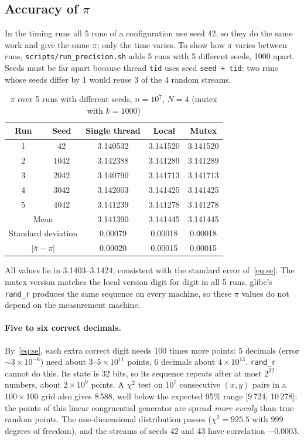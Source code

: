 \documentclass[11pt,a4paper]{article}
\newcommand{\code}[1]{\texttt{#1}}
\begin{document}
\subsection{Accuracy of $\pi$}
\label{sec:pi}
In the timing runs all 5 runs of a configuration use seed 42, so they do the same work and give the same $\pi$; only the time varies. To show how $\pi$ varies between runs, \code{scripts/run\_precision.sh} adds 5 runs with 5 different seeds, 1000 apart. Seeds must be far apart because thread \code{tid} uses seed \code{seed + tid}: two runs whose seeds differ by 1 would reuse 3 of the 4 random streams.

\begin{table}[H]
\centering
\caption{$\pi$ over 5 runs with different seeds, $n=10^7$, $N=4$ (mutex with $k=1000$)}
\label{tab:pi_runs}
\begin{tabular}{cc|ccc}
\toprule
Run & Seed & Single thread & Local & Mutex \\
\midrule
1 & 42   & 3.140532 & 3.141520 & 3.141520 \\
2 & 1042 & 3.142388 & 3.141289 & 3.141289 \\
3 & 2042 & 3.140790 & 3.141713 & 3.141713 \\
4 & 3042 & 3.142003 & 3.141425 & 3.141425 \\
5 & 4042 & 3.141239 & 3.141278 & 3.141278 \\
\midrule
\multicolumn{2}{c|}{Mean} & 3.141390 & 3.141445 & 3.141445 \\
\multicolumn{2}{c|}{Standard deviation} & 0.00079 & 0.00018 & 0.00018 \\
\multicolumn{2}{c|}{$|\bar\pi-\pi|$} & 0.00020 & 0.00015 & 0.00015 \\
\bottomrule
\end{tabular}
\end{table}
All values lie in 3.1403--3.1424, consistent with the standard error of~\eqref{eq:se}. The mutex version matches the local version digit for digit in all 5 runs. glibc's \code{rand\_r} produces the same sequence on every machine, so these $\pi$ values do not depend on the measurement machine.

\paragraph*{Five to six correct decimals.} By~\eqref{eq:se}, each extra correct digit needs 100 times more points: 5 decimals (error $\sim3\times10^{-6}$) need about $3$--$5\times10^{11}$ points, 6 decimals about $4\times10^{13}$. \code{rand\_r} cannot do this. Its state is 32 bits, so its sequence repeats after at most $2^{32}$ numbers, about $2\times10^9$ points. A $\chi^2$ test on $10^7$ consecutive $(x,y)$ pairs in a $100\times100$ grid also gives 8\,588, well below the expected 95\% range [9\,724; 10\,278]: the points of this linear congruential generator are spread \emph{more evenly} than true random points. The one-dimensional distribution passes ($\chi^2=925.5$ with 999 degrees of freedom), and the streams of seeds 42 and 43 have correlation $-0.0003$.
\end{document}

